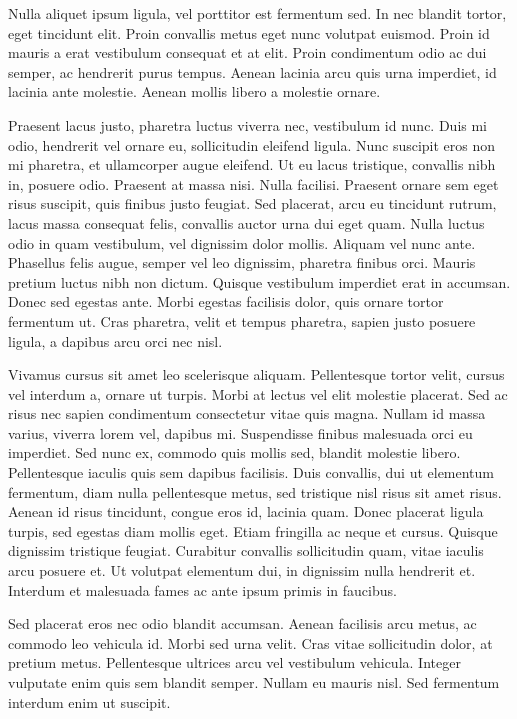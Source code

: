 \documentclass[10pt,twoside,slovak,a4paper]{article}
\begin{document}
Nulla aliquet ipsum ligula, vel porttitor est fermentum sed. In nec blandit tortor, eget tincidunt elit. Proin convallis metus eget nunc volutpat euismod. Proin id mauris a erat vestibulum consequat et at elit. Proin condimentum odio ac dui semper, ac hendrerit purus tempus. Aenean lacinia arcu quis urna imperdiet, id lacinia ante molestie. Aenean mollis libero a molestie ornare.

Praesent lacus justo, pharetra luctus viverra nec, vestibulum id nunc. Duis mi odio, hendrerit vel ornare eu, sollicitudin eleifend ligula. Nunc suscipit eros non mi pharetra, et ullamcorper augue eleifend. Ut eu lacus tristique, convallis nibh in, posuere odio. Praesent at massa nisi. Nulla facilisi. Praesent ornare sem eget risus suscipit, quis finibus justo feugiat. Sed placerat, arcu eu tincidunt rutrum, lacus massa consequat felis, convallis auctor urna dui eget quam. Nulla luctus odio in quam vestibulum, vel dignissim dolor mollis. Aliquam vel nunc ante. Phasellus felis augue, semper vel leo dignissim, pharetra finibus orci. Mauris pretium luctus nibh non dictum. Quisque vestibulum imperdiet erat in accumsan. Donec sed egestas ante. Morbi egestas facilisis dolor, quis ornare tortor fermentum ut. Cras pharetra, velit et tempus pharetra, sapien justo posuere ligula, a dapibus arcu orci nec nisl.

Vivamus cursus sit amet leo scelerisque aliquam. Pellentesque tortor velit, cursus vel interdum a, ornare ut turpis. Morbi at lectus vel elit molestie placerat. Sed ac risus nec sapien condimentum consectetur vitae quis magna. Nullam id massa varius, viverra lorem vel, dapibus mi. Suspendisse finibus malesuada orci eu imperdiet. Sed nunc ex, commodo quis mollis sed, blandit molestie libero. Pellentesque iaculis quis sem dapibus facilisis. Duis convallis, dui ut elementum fermentum, diam nulla pellentesque metus, sed tristique nisl risus sit amet risus. Aenean id risus tincidunt, congue eros id, lacinia quam. Donec placerat ligula turpis, sed egestas diam mollis eget. Etiam fringilla ac neque et cursus. Quisque dignissim tristique feugiat. Curabitur convallis sollicitudin quam, vitae iaculis arcu posuere et. Ut volutpat elementum dui, in dignissim nulla hendrerit et. Interdum et malesuada fames ac ante ipsum primis in faucibus.

Sed placerat eros nec odio blandit accumsan. Aenean facilisis arcu metus, ac commodo leo vehicula id. Morbi sed urna velit. Cras vitae sollicitudin dolor, at pretium metus. Pellentesque ultrices arcu vel vestibulum vehicula. Integer vulputate enim quis sem blandit semper. Nullam eu mauris nisl. Sed fermentum interdum enim ut suscipit.
\end{document}
